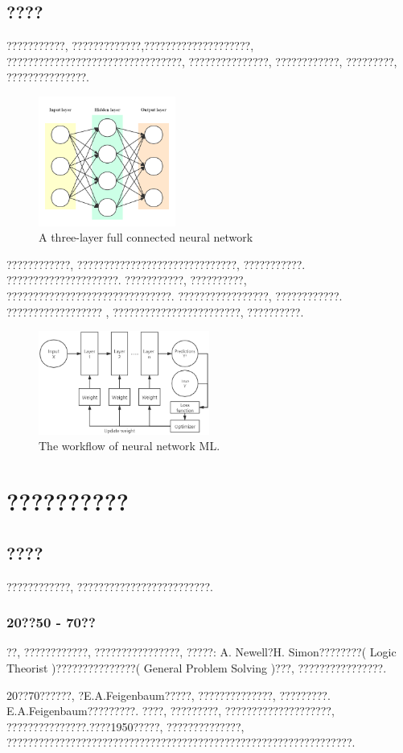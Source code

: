 \documentclass[lang=cn,11pt,a4paper]{elegantpaper}
\begin{document}
\subsection{????}
\par ???????????, ?????????????,????????????????????, ?????????????????????????????????, ???????????????, ????????????, ?????????, ???????????????. 
\begin{figure}[htbp]
	\centering
	\includegraphics[width=0.4\textwidth]{DNN}
  	\caption{A three-layer full connected neural network\label{fig:DNN}}
\end{figure}
\par ????????????, ??????????????????????????????,  ???????????. ?????????????????????. ???????????, ??????????, ???????????????????????????????. ?????????????????, ????????????. ?????????????????? , ????????????????????????, ??????????.
\begin{figure}[htbp]
	\centering
	\hspace{-30pt}\includegraphics[width=0.5\textwidth]{Net}
  	\caption{The workflow of neural network ML.\label{fig:net}}
\end{figure}
\section{??????????}
\subsection{????}
\par ????????????, ?????????????????????????. 
\subsubsection*{20??50 - 70??}
\par ??, ????????????, ????????????????, ?????: A. Newell?H. Simon????????( Logic Theorist )???????????????( General Problem Solving )???, ????????????????. 
\par 20??70??????, ?E.A.Feigenbaum?????, ??????????????, ?????????. E.A.Feigenbaum?????????. ????, ?????????, ????????????????????, ???????????????.????1950?????, ??????????????, ?????????????????????????????????????????????????????????????????.
\end{document}
